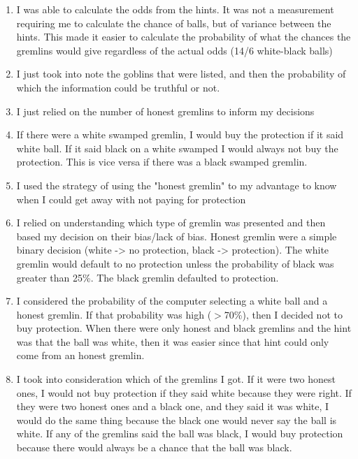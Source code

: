 \documentclass[12pt,a4paper]{article}
\begin{document}
\begin{enumerate}
\item I was able to calculate the odds from the hints. It was not a measurement requiring me to calculate the chance of balls, but of variance between the hints. This made it easier to calculate the probability of what the chances the gremlins would give regardless of the actual odds (14/6 white-black balls)

\item I just took into note the goblins that were listed, and then the probability of which the information could be truthful or not.

\item I just relied on the number of honest gremlins to inform my decisions

\item If there were a white swamped gremlin, I would buy the protection if it said white ball. If it said black on a white swamped I would always not buy the protection. This is vice versa if there was a black swamped gremlin.

\item I used the strategy of using the "honest gremlin" to my advantage to know when I could get away with not paying for protection

\item I relied on understanding which type of gremlin was presented and then based my decision on their bias/lack of bias. Honest gremlin were a simple binary decision (white -> no protection, black -> protection). The white gremlin would default to no protection unless the probability of black was greater than 25\%. The black gremlin defaulted to protection.

\item I considered the probability of the computer selecting a white ball and a honest gremlin. If that probability was high ($>$70\%), then I decided not to buy protection. When there were only honest and black gremlins and the hint was that the ball was white, then it was easier since that hint could only come from an honest gremlin.

\item I took into consideration which of the gremlins I got. If it were two honest ones, I would not buy protection if they said white because they were right. If they were two honest ones and a black one, and they said it was white, I would do the same thing because the black one would never say the ball is white. If any of the gremlins said the ball was black, I would buy protection because there would always be a chance that the ball was black.


\end{enumerate}
\end{document}
